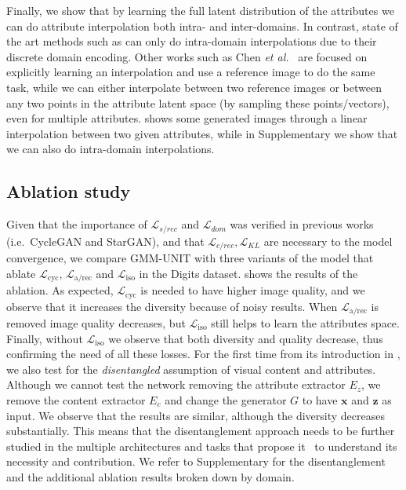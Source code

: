 \documentclass[runningheads]{llncs}
\begin{document}
Finally, we show that by learning  the full latent distribution of the attributes we can do attribute interpolation both intra- and inter-domains. In contrast, state of the art methods such as \cite{lee2019drit++} can only do intra-domain interpolations due to their discrete domain encoding. Other works such as Chen \emph{et al.}~\cite{chen2019homomorphic} are focused on explicitly learning an interpolation and use a reference image to do the same task, while we can either interpolate between two reference images or between any two points in the attribute latent space (by sampling these points/vectors), even for multiple attributes.
 shows some generated images through a linear interpolation between two given attributes, while in Supplementary we show that we can also do intra-domain interpolations.


\subsection{Ablation study}
Given that the importance of $\mathcal{L}_{s/rec}$ and $\mathcal{L}_{dom}$ was verified in previous works (i.e.\ CycleGAN and StarGAN), and that $\mathcal{L}_{c/rec}, \mathcal{L}_{KL}$ are necessary to the model convergence, we compare GMM-UNIT with three variants of the model that ablate $\mathcal{L}_{\textrm{cyc}}$, $\mathcal{L}_{\textrm{a/rec}}$ and $\mathcal{L}_{\textrm{iso}}$ in the Digits dataset.
 shows the results of the ablation.
As expected, $\mathcal{L}_{\textrm{cyc}}$ is needed to have higher image quality, and we observe that it increases the diversity because of noisy results. When $\mathcal{L}_{\textrm{a/rec}}$ is removed image quality decreases, but $\mathcal{L}_{\textrm{iso}}$ still helps to learn the attributes space. Finally, without $\mathcal{L}_{\textrm{iso}}$ we observe that both diversity and quality decrease, thus confirming the need of all these losses.
For the first time from its introduction in \cite{huang2018multimodal}, we also test for the \emph{disentangled} assumption of visual content and attributes.
Although we cannot test the network removing the attribute extractor $E_z$, we remove the content extractor $E_c$ and change the generator $G$ to have $\mathbf{x}$ and $\mathbf{z}$ as input.
We observe that the results are similar, although the diversity decreases substantially. This means that the disentanglement approach needs to be further studied in the multiple architectures and tasks that propose it~\cite{gonzalez2018image,huang2018multimodal,wu2019transgaga} to understand its necessity and contribution. 
We refer to Supplementary for the disentanglement and the additional ablation results broken down by domain.
 
\end{document}
